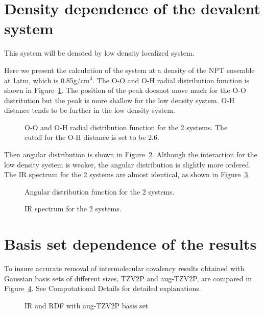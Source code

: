 \documentclass[aps,prl,reprint,amsmath,amssymb]{revtex4-1}
\begin{document}
\section{Density dependence of the devalent system} 

This system will be denoted by low density localized system.

Here we present the calculation of the system at a density of the NPT ensemble at 1atm, which is 0.85g/cm$^3$. 
The O-O and O-H radial distribution function is shown in Figure~\ref{Fig:rdf_cp}. 
The position of the peak doesnot move much for the O-O distritution but the peak is more shallow for the low density system. 
O-H distance tends to be further in the low density system.

\begin{figure}
\caption{O-O and O-H radial distribution function for the 2 systems. The cutoff for the O-H distance is set to be 2.6\Ang.}\label{Fig:rdf_cp}
\end{figure} 

Then angular distribution is shown in Figure~\ref{Fig:adfcp}. 
Although the interaction for the low density system is weaker, the angular distribution is slightly more ordered. 
The IR spectrum for the 2 systems are almost identical, as shown in Figure~\ref{Fig:ir_cp}.

\begin{figure}
\caption{Angular distribution function for the 2 systems.}\label{Fig:adfcp}
\end{figure} 

\begin{figure}
\caption{IR spectrum for the 2 systems.}\label{Fig:ir_cp}
\end{figure} 

\section{Basis set dependence of the results} 

To insure accurate removal of intermolecular covalency results obtained with Gaussian basis sets of different sizes, TZV2P and aug-TZV2P, are compared in Figure~\ref{Fig:basis}. See Computational Details for detailed explanations.

\begin{figure}
\caption{IR and RDF with aug-TZV2P basis set}\label{Fig:basis}
\end{figure} 

\fi %
\end{document}
